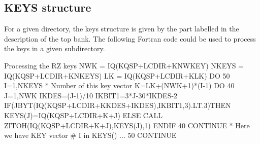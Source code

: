 \finalnewpage
\subsection*{KEYS structure}

For a given directory, the keys structure is given
by the part labelled  in the description of the top bank.
%
The following Fortran code could be used to process the keys 
in a given subdirectory.
\begin{XMPt}{Processing the RZ keys}
      NWK        = IQ(KQSP+LCDIR+KNWKEY)
      NKEYS      = IQ(KQSP+LCDIR+KNKEYS)
      LK         = IQ(KQSP+LCDIR+KLK)
      DO 50 I=1,NKEYS
*           Number of this key vector
         K=LK+(NWK+1)*(I-1)
         DO 40 J=1,NWK
            IKDES=(J-1)/10
            IKBIT1=3*J-30*IKDES-2
            IF(JBYT(IQ(KQSP+LCDIR+KKDES+IKDES),IKBIT1,3).LT.3)THEN
               KEYS(J)=IQ(KQSP+LCDIR+K+J)
            ELSE
               CALL ZITOH(IQ(KQSP+LCDIR+K+J),KEYS(J),1)
            ENDIF
  40     CONTINUE
*         Here we have KEY vector # I in KEYS()
      ...
  50  CONTINUE
\end{XMPt}
